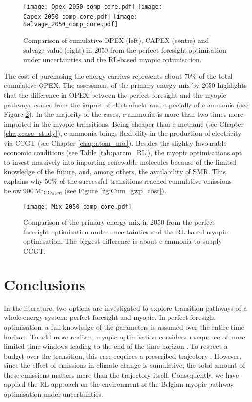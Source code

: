 \begin{figure}[!htbp]
\centering
\texttt{[image: Opex\_2050\_comp\_core.pdf]}
\texttt{[image: Capex\_2050\_comp\_core.pdf]}
\texttt{[image: Salvage\_2050\_comp\_core.pdf]}
\caption{Comparison of cumulative OPEX (left), CAPEX (centre) and salvage value (right) in 2050 from the perfect foresight optimisation under uncertainties and the \gls{RL}-based myopic optimisation.}
\label{fig:Opex_Capex_Salvage_comp}
\end{figure}

The cost of purchasing the energy carriers represents about 70\% of the total cumulative \gls{OPEX}. The assessment of the primary energy mix by 2050 highlights that the difference in OPEX between the perfect foresight and the myopic pathways comes from the import of electrofuels, and especially of e-ammonia (see Figure \ref{fig:Mix_2050_comp}).  In the majority of the cases, e-ammonia is more than two times more imported in the myopic transitions. Being cheaper than e-methane (see Chapter \ref{chap:case_study}), e-ammonia brings flexibility in the production of electricity via \gls{CCGT} (see Chapter \ref{chap:atom_mol}). Besides the slightly favourable economic conditions (see Table \ref{tab:param_RL}), the myopic optimisations opt to invest massively into importing renewable molecules because of the limited knowledge of the future, and, among others, the availability of \gls{SMR}. This explains why 50\% of the successful transitions reached cumulative emissions below 900\,Mt$_{\ce{CO2},\text{eq}}$ (see Figure \ref{fig:Cum_gwp_cost}).

\begin{figure}[!htbp]
\centering
\texttt{[image: Mix\_2050\_comp\_core.pdf]}
\caption{Comparison of the primary energy mix in 2050 from the perfect foresight optimisation under uncertainties and the \gls{RL}-based myopic optimisation. The biggest difference is about e-ammonia to supply \gls{CCGT}.}
\label{fig:Mix_2050_comp}
\end{figure}


\section{Conclusions}
\label{sec:RL:conclusions}
In the literature, two options are investigated to explore transition pathways of a whole-energy system: perfect foresight and myopic. In perfect foresight optimisation, a full knowledge of the parameters is assumed over the entire time horizon. To add more realism, myopic optimisation considers a sequence of more limited time windows leading to the end of the time horizon \cite{poncelet2016myopic}. To respect a  budget over the transition, this case requires a prescribed  trajectory \cite{fais2016impact}. However, since the effect of  emissions in climate change is cumulative, the total amount of these emissions matters more than the trajectory itself. Consequently, we have applied the \acrfull{RL} approach on the environment of the Belgian myopic pathway optimisation under uncertainties.

